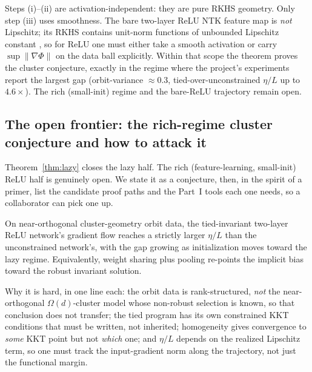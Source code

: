 \begin{remark}
\label{rem:relu}
Steps (i)--(ii) are activation-independent: they are pure RKHS geometry. Only step (iii) uses
smoothness. The bare two-layer ReLU NTK feature map is \emph{not} Lipschitz; its RKHS contains
unit-norm functions of unbounded Lipschitz constant \citep{biettimairal2019}, so for ReLU one must
either take a smooth activation or carry $\sup\|\nabla\Phi\|$ on the data ball explicitly. Within that
scope the theorem proves the cluster conjecture, exactly in the regime where the project's
experiments report the largest gap (orbit-variance $\approx 0.3$, tied-over-unconstrained $\eta/L$ up
to $4.6\times$). The rich (small-init) regime and the bare-ReLU trajectory remain open.
\end{remark}


\subsection{The open frontier: the rich-regime cluster conjecture and how to attack it}
\label{sub:conjecture}

Theorem~\ref{thm:lazy} closes the lazy half. The rich (feature-learning, small-init) ReLU half is
genuinely open. We state it as a conjecture, then, in the spirit of a primer, list the candidate
proof paths and the Part~I tools each one needs, so a collaborator can pick one up.

\begin{conjecture}
\label{conj:cluster}
On near-orthogonal cluster-geometry orbit data, the tied-invariant two-layer ReLU network's gradient
flow reaches a strictly larger $\eta/L$ than the unconstrained network's, with the gap growing as
initialization moves toward the lazy regime. Equivalently, weight sharing plus pooling re-points the
implicit bias toward the robust invariant solution.
\end{conjecture}

Why it is hard, in one line each: the orbit data is rank-structured, \emph{not} the near-orthogonal
$\Omega(d)$-cluster model whose non-robust selection is known, so that conclusion does not transfer;
the tied program has its own constrained KKT conditions that must be written, not inherited;
homogeneity gives convergence to \emph{some} KKT point but not \emph{which} one; and $\eta/L$ depends on
the realized Lipschitz term, so one must track the input-gradient norm along the trajectory, not just
the functional margin.

